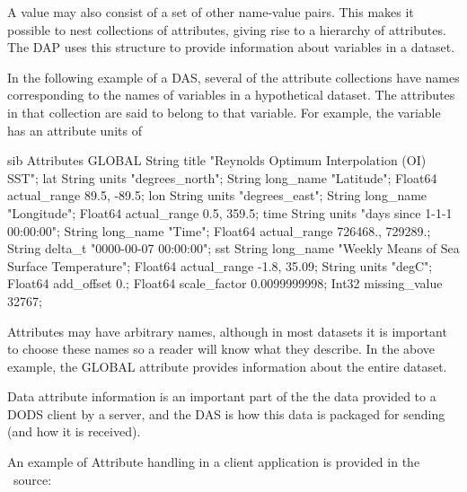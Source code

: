 \documentclass{dods-paper}
\begin{document}
A value may also consist of a set of other name-value pairs. This makes it
possible to nest collections of attributes, giving rise to a hierarchy of
attributes. The DAP uses this structure to provide information about
variables in a dataset.

In the following example of a DAS, several of the attribute collections have
names corresponding to the names of variables in a hypothetical dataset. The
attributes in that collection are said to belong to that variable. For
example, the  variable has an attribute units of

\begin{vcode}{sib}
 Attributes {
    GLOBAL {
       String title "Reynolds Optimum Interpolation (OI) SST";
    }
    lat {
       String units "degrees_north";
       String long_name "Latitude";
       Float64 actual_range 89.5, -89.5;
    }
    lon {
       String units "degrees_east";
       String long_name "Longitude";
       Float64 actual_range 0.5, 359.5;
    }
    time {
       String units "days since 1-1-1 00:00:00";
       String long_name "Time";
       Float64 actual_range 726468., 729289.;
       String delta_t "0000-00-07 00:00:00";
    }
    sst {
       String long_name "Weekly Means of Sea Surface Temperature";
       Float64 actual_range -1.8, 35.09;
       String units "degC";
       Float64 add_offset 0.;
       Float64 scale_factor 0.0099999998;
       Int32 missing_value 32767;
   }
 }
\end{vcode}

Attributes may have arbitrary names, although in most datasets it is
important to choose these names so a reader will know what they
describe. In the above example, the GLOBAL attribute provides
information about the entire dataset.

Data attribute information is an important part of the the data
provided to a DODS client by a server, and the DAS is how this data is
packaged for sending (and how it is received).

An example of Attribute handling in a client application is provided in
the  \Cpp\ source:
\end{document}
